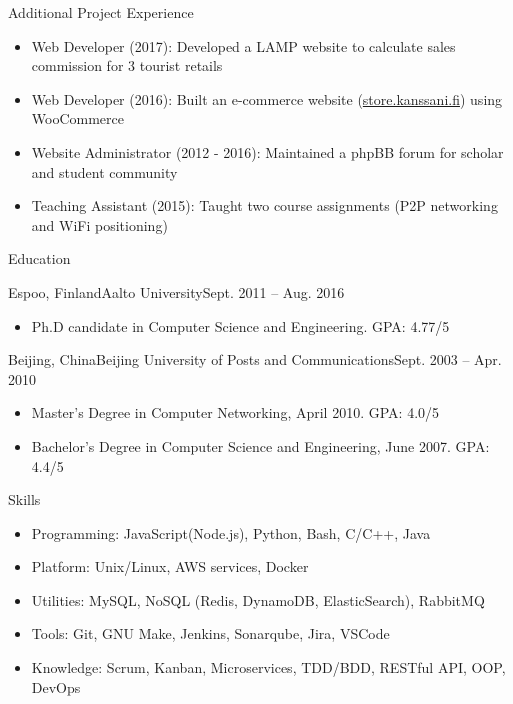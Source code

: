 \documentclass[print]{mcdowellcv}
\begin{document}
	\begin{cvsection}{Additional Project Experience}
		\begin{cvsubsection}{}{}{}	
			\begin{itemize}
				\item Web Developer (2017): Developed a LAMP website to calculate sales commission for 3 tourist retails
				\item Web Developer (2016): Built an e-commerce website (\url{store.kanssani.fi}) using WooCommerce
				\item Website Administrator (2012 - 2016): Maintained a phpBB forum for scholar and student community
				\item Teaching Assistant (2015): Taught two course assignments (P2P networking and WiFi positioning)
			\end{itemize}
		\end{cvsubsection}
	\end{cvsection}
	
	\begin{cvsection}{Education}
		\begin{cvsubsection}{Espoo, Finland}{Aalto University}{Sept. 2011 -- Aug. 2016}
			\begin{itemize}
				\item Ph.D candidate in Computer Science and Engineering. GPA: 4.77/5
			\end{itemize}
		\end{cvsubsection}

		\begin{cvsubsection}[2]{Beijing, China}{Beijing University of Posts and Communications}{Sept. 2003 --  Apr. 2010}
			\begin{itemize}
				\item Master's Degree in Computer Networking, April 2010. GPA: 4.0/5				 
				\item Bachelor's Degree in Computer Science and Engineering, June 2007. GPA: 4.4/5
			\end{itemize}
		\end{cvsubsection}
	\end{cvsection}
	
	\begin{cvsection}{Skills}
		\begin{cvsubsection}{}{}{}	
			\begin{itemize}
				\item Programming: JavaScript(Node.js), Python, Bash, C/C++, Java
				\item Platform: Unix/Linux, AWS services, Docker
				\item Utilities: MySQL, NoSQL (Redis, DynamoDB, ElasticSearch), RabbitMQ
				\item Tools: Git, GNU Make, Jenkins, Sonarqube, Jira, VSCode
				\item Knowledge: Scrum, Kanban, Microservices, TDD/BDD, RESTful API, OOP, DevOps
			\end{itemize}
		\end{cvsubsection}
	\end{cvsection}
\end{document}
